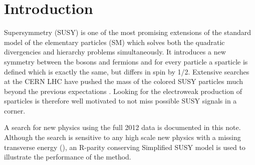 \section{Introduction}
\label{sect:introduction}

Supersymmetry \cite{Martin:1997ns} (SUSY) is one of the most promising extensions of the 
standard model of the elementary particles (SM) which solves both the 
quadratic divergencies and hierarchy problems simultaneously. It introduces a new symmetry between the bosons and fermions and 
for every particle a sparticle is defined which is exactly the same, but differs in spin by 1/2. 
Extensive searches at the CERN LHC have pushed the mass of the colored SUSY particles much beyond the previous expectations \cite{susyPhyRes}. 
Looking for the electroweak production of sparticles is therefore well motivated to not miss possible SUSY signals in a corner. 


A search for new physics using the full 2012 data is documented in this note. 
Although the search is sensitive to any high scale 
new physics with a missing transverse energy (\MPT), 
an R-parity conserving Simplified SUSY model \cite{Alwall:2008ag,alves:sms} is used 
to illustrate the performance of the method.

